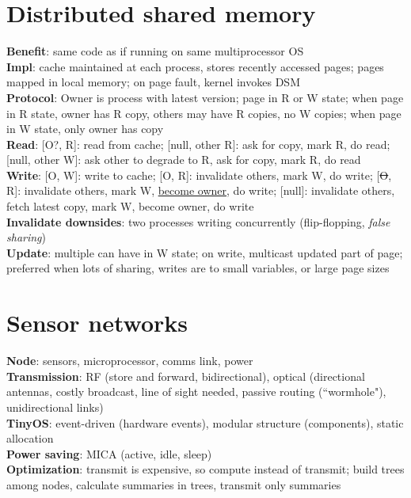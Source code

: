 \documentclass{article}
\begin{document}
\begin{multicols*}{3}
\section{Distributed shared memory}
\textbf{Benefit}: same code as if running on same multiprocessor OS \\
\textbf{Impl}: cache maintained at each process, stores recently accessed pages; pages mapped in local memory; on page fault, kernel invokes DSM \\
\textbf{Protocol}: Owner is process with latest version; page in R or W state; when page in R state, owner has R copy, others may have R copies, no W copies; when page in W state, only owner has copy \\
\textbf{Read}: [O?, R]: read from cache; [null, other R]: ask for copy, mark R, do read; [null, other W]: ask other to degrade to R, ask for copy, mark R, do read \\
\textbf{Write}: [O, W]: write to cache; [O, R]: invalidate others, mark W, do write; [\sout{O}, R]: invalidate others, mark W, \underline{become owner}, do write; [null]: invalidate others, fetch latest copy, mark W, become owner, do write \\
\textbf{Invalidate downsides}: two processes writing concurrently (flip-flopping, \textit{false sharing}) \\
\textbf{Update}: multiple can have in W state; on write, multicast updated part of page; preferred when lots of sharing, writes are to small variables, or large page sizes

\section{Sensor networks}
\textbf{Node}: sensors, microprocessor, comms link, power \\
\textbf{Transmission}: RF (store and forward, bidirectional), optical (directional antennas, costly broadcast, line of sight needed, passive routing (``wormhole"), unidirectional links) \\
\textbf{TinyOS}: event-driven (hardware events), modular structure (components), static allocation \\
\textbf{Power saving}: MICA (active, idle, sleep) \\
\textbf{Optimization}: transmit is expensive, so compute instead of transmit; build trees among nodes, calculate summaries in trees, transmit only summaries


\end{multicols*}
\end{document}
